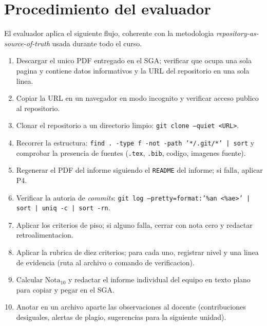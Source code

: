 \documentclass[11pt,a4paper]{article}
\begin{document}
\section{Procedimiento del evaluador}

El evaluador aplica el siguiente flujo, coherente con la metodologia \emph{repository-as-source-of-truth} usada durante todo el curso.

\begin{enumerate}
    \item Descargar el unico PDF entregado en el SGA; verificar que ocupa una sola pagina y contiene datos informativos y la URL del repositorio en una sola linea.
    \item Copiar la URL en un navegador en modo incognito y verificar acceso publico al repositorio.
    \item Clonar el repositorio a un directorio limpio: \texttt{git clone --quiet <URL>}.
    \item Recorrer la estructura: \texttt{find . -type f -not -path '*/.git/*' | sort} y comprobar la presencia de fuentes (\texttt{.tex}, \texttt{.bib}, codigo, imagenes fuente).
    \item Regenerar el PDF del informe siguiendo el \texttt{README} del informe; si falla, aplicar P4.
    \item Verificar la autoria de \emph{commits}: \texttt{git log --pretty=format:'\%an <\%ae>' | sort | uniq -c | sort -rn}.
    \item Aplicar los criterios de piso; si alguno falla, cerrar con nota cero y redactar retroalimentacion.
    \item Aplicar la rubrica de diez criterios; para cada uno, registrar nivel y una linea de evidencia (ruta al archivo o comando de verificacion).
    \item Calcular $\text{Nota}_{10}$ y redactar el informe individual del equipo en texto plano para copiar y pegar en el SGA.
    \item Anotar en un archivo aparte las observaciones al docente (contribuciones desiguales, alertas de plagio, sugerencias para la siguiente unidad).
\end{enumerate}



\end{document}
